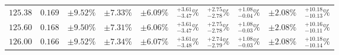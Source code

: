 \begin{table}[ht!]
{{\begin{tabular}{| cc | ccc | cccc | c |}
$125.38$ & $0.169$ & $\pm9.52\%$ & {\color{black!55}$\pm 7.33\%$} & {\color{black!55}$\pm 6.09\%$} & $^{+3.61}_{-3.47}\%$ & {\color{black!55}$^{+2.75}_{-2.78}\%$} & {\color{black!55}$^{+1.08}_{-0.04}\%$} & {\color{black!55}$\pm 2.08\%$} & $^{+10.18}_{-10.13}\%$  \\
$125.60$ & $0.168$ & $\pm9.50\%$ & {\color{black!55}$\pm 7.31\%$} & {\color{black!55}$\pm 6.06\%$} & $^{+3.61}_{-3.47}\%$ & {\color{black!55}$^{+2.75}_{-2.78}\%$} & {\color{black!55}$^{+1.08}_{-0.03}\%$} & {\color{black!55}$\pm 2.08\%$} & $^{+10.16}_{-10.11}\%$  \\
$126.00$ & $0.166$ & $\pm9.52\%$ & {\color{black!55}$\pm 7.34\%$} & {\color{black!55}$\pm 6.07\%$} & $^{+3.61}_{-3.48}\%$ & {\color{black!55}$^{+2.74}_{-2.79}\%$} & {\color{black!55}$^{+1.08}_{-0.03}\%$} & {\color{black!55}$\pm 2.08\%$} & $^{+10.18}_{-10.14}\%$  \\

\end{tabular}}}
\end{table}
